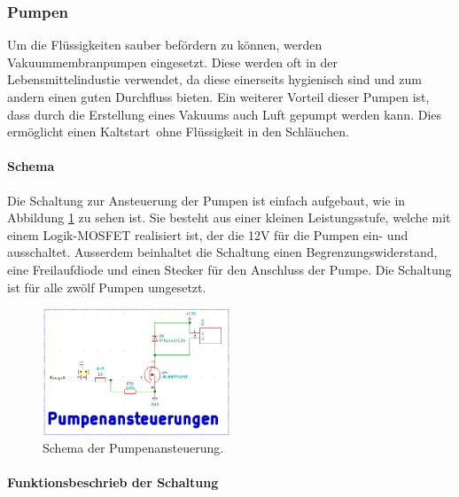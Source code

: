 \subsubsection{Pumpen}
\label{subsubsec:Pumpen}

Um die Flüssigkeiten sauber befördern zu können, werden Vakuummembranpumpen eingesetzt. Diese werden oft in der Lebensmittelindustie verwendet, da diese einerseits hygienisch sind und zum andern einen guten Durchfluss bieten. Ein weiterer Vorteil dieser Pumpen ist, dass durch die Erstellung eines Vakuums auch Luft gepumpt werden kann. Dies ermöglicht einen \flqq Kaltstart\frqq\ ohne Flüssigkeit in den Schläuchen. \cite{aiyimaindustrial_store_us_nodate}

\paragraph{Schema}\mbox{}

Die Schaltung zur Ansteuerung der Pumpen ist einfach aufgebaut, wie in Abbildung \ref{fig:Schema_Pumpenansteuerung} zu sehen ist. Sie besteht aus einer kleinen Leistungsstufe, welche mit einem Logik-MOSFET realisiert ist, der die 12V für die Pumpen  ein- und ausschaltet. Ausserdem beinhaltet die Schaltung einen Begrenzungswiderstand, eine Freilaufdiode und einen Stecker für den Anschluss der Pumpe. Die Schaltung ist für alle zwölf Pumpen umgesetzt. 

\begin{figure}[h!]
	\centering
	\includegraphics[width=0.5\textwidth]{graphics/Schema_Pumpenansteuerung.png}
	\caption{Schema der Pumpenansteuerung.}
	\label{fig:Schema_Pumpenansteuerung}
\end{figure}

\paragraph{Funktionsbeschrieb der Schaltung}\mbox{}

